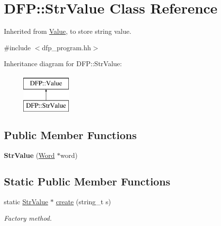 \hypertarget{class_d_f_p_1_1_str_value}{}\section{D\+FP\+:\+:Str\+Value Class Reference}
\label{class_d_f_p_1_1_str_value}


Inherited from \hyperlink{class_d_f_p_1_1_value}{Value}, to store string value.  




{\ttfamily \#include $<$dfp\+\_\+program.\+hh$>$}

Inheritance diagram for D\+FP\+:\+:Str\+Value\+:\begin{figure}[H]
\begin{center}
\leavevmode
\includegraphics[height=2.000000cm]{class_d_f_p_1_1_str_value}
\end{center}
\end{figure}
\subsection*{Public Member Functions}
\begin{DoxyCompactItemize}
\item 
{\bfseries Str\+Value} (\hyperlink{class_d_f_p_1_1_word}{Word} $\ast$word)\hypertarget{class_d_f_p_1_1_str_value_a8a7c872f531c50246a0095e4df8f11a7}{}\label{class_d_f_p_1_1_str_value_a8a7c872f531c50246a0095e4df8f11a7}

\end{DoxyCompactItemize}
\subsection*{Static Public Member Functions}
\begin{DoxyCompactItemize}
\item 
static \hyperlink{class_d_f_p_1_1_str_value}{Str\+Value} $\ast$ \hyperlink{class_d_f_p_1_1_str_value_a7870713b8d1748f6f460412a5420a85e}{create} (string\+\_\+t s)\hypertarget{class_d_f_p_1_1_str_value_a7870713b8d1748f6f460412a5420a85e}{}\label{class_d_f_p_1_1_str_value_a7870713b8d1748f6f460412a5420a85e}

\begin{DoxyCompactList}\small\item\em Factory method. \end{DoxyCompactList}\end{DoxyCompactItemize}
